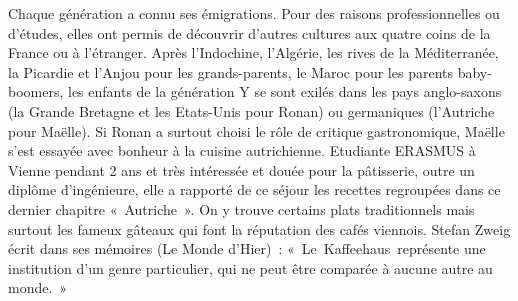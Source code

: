 Chaque génération a connu ses émigrations. Pour des raisons professionnelles ou d’études, elles ont permis de découvrir d’autres cultures aux quatre coins de la France ou à l’étranger. Après l’Indochine, l’Algérie, les rives de la Méditerranée, la Picardie et l’Anjou pour les grands-parents, le Maroc pour les parents baby-boomers, les enfants de la génération Y se sont exilés dans les pays anglo-saxons (la Grande Bretagne et les Etats-Unis pour Ronan) ou germaniques (l’Autriche pour Maëlle).
Si Ronan a surtout choisi le rôle de critique gastronomique, Maëlle s’est essayée avec bonheur à la cuisine autrichienne. Etudiante ERASMUS à Vienne pendant 2 ans et très intéressée et douée pour la pâtisserie, outre un diplôme d’ingénieure, elle a rapporté de ce séjour les recettes regroupées dans ce dernier chapitre « Autriche ». On y trouve certains plats traditionnels mais surtout les fameux gâteaux qui font la réputation des cafés viennois. Stefan Zweig écrit dans ses mémoires (Le Monde d’Hier) : « Le Kaffeehaus représente une institution d'un genre particulier, qui ne peut être comparée à aucune autre au monde. »
